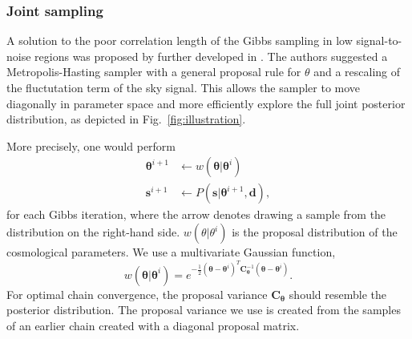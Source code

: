 \documentclass[twocolumn]{../common/aa}
\begin{document}
\subsubsection{Joint sampling}
\label{sec:joint-sampling}
A solution to the poor correlation length of the Gibbs sampling in low signal-to-noise regions was proposed by \cite{jewell:2009} further developed in \cite{racine:2016}. The authors suggested a Metropolis-Hasting sampler with a general proposal rule for $\theta$ and a rescaling of the fluctutation term of the sky signal. This allows the sampler to move diagonally in parameter space and more efficiently explore the full joint posterior distribution, as depicted in Fig.~\ref{fig:illustration}.

More precisely, one would perform
\begin{align}
    \boldsymbol{\theta}^{i+1} 
 &\leftarrow w(\boldsymbol{\theta} |\boldsymbol{\theta}^i)\\
 \boldsymbol{s}^{i+1} &\leftarrow P(\boldsymbol{s} | \boldsymbol{\theta}^{i+1}, \boldsymbol{d}),
\end{align}
for each Gibbs iteration, where the arrow denotes drawing a sample from the distribution on the right-hand side. $w(\theta |\theta^i)$ is the proposal distribution of the cosmological parameters. We use a multivariate Gaussian function,
\begin{equation}
w(\boldsymbol{\theta} |\boldsymbol{\theta}^i) = e^{-\frac12 \left(\boldsymbol{\theta} - \boldsymbol{\theta}^i \right)^T \boldsymbol{C}_{\boldsymbol{\theta}}^{-1}\left(\boldsymbol{\theta} - \boldsymbol{\theta}^i \right)}.
\end{equation}
For optimal chain convergence, the proposal variance $\boldsymbol{C}_{\boldsymbol{\theta}}$ should resemble the posterior distribution. The proposal variance we use is created from the samples of an earlier chain created with a diagonal proposal matrix.
\end{document}
